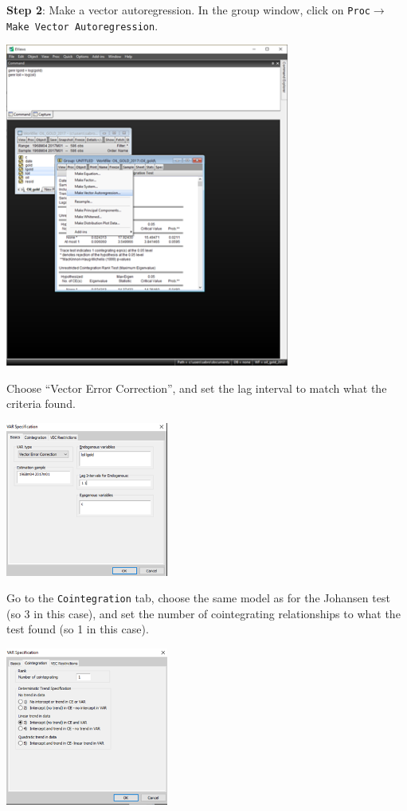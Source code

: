 \documentclass[11pt, a4paper]{article}
\begin{document}
\begin{enumerate}
\begin{enumerate}
\noindent\textbf{Step 2}: Make a vector autoregression. In the group window, click on \texttt{Proc$\rightarrow$Make Vector Autoregression}.
\begin{center}
\includegraphics[width=0.7\textwidth]{johanseneviews7}
\end{center}
Choose “Vector Error Correction”, and set the lag interval to match what the criteria found.
\begin{center}
\includegraphics[width=0.4\textwidth]{johanseneviews8}
\end{center}
Go to the \texttt{Cointegration} tab, choose the same model as for the Johansen test (so 3 in this case), and set the number of cointegrating relationships to what the test found (so 1 in this case).
\begin{center}
\includegraphics[width=0.4\textwidth]{johanseneviews9}

\end{center}
\end{enumerate}
\end{enumerate}
\end{document}
